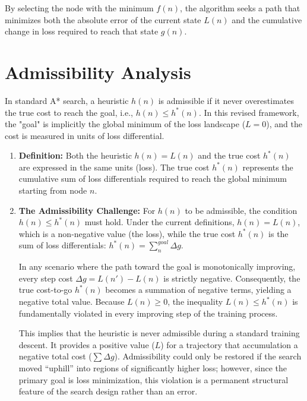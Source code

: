 By selecting the node with the minimum $f(n)$, the algorithm seeks a path that minimizes both the absolute error of the current state $L(n)$ and the cumulative change in loss required to reach that state $g(n)$.
\section{Admissibility Analysis}

In standard A* search, a heuristic $h(n)$ is admissible if it never overestimates the true cost to reach the goal, i.e., $h(n) \le h^*(n)$. In this revised framework, the "goal" is implicitly the global minimum of the loss landscape ($L=0$), and the cost is measured in units of loss differential.

\begin{enumerate}
    \item \textbf{Definition:} Both the heuristic $h(n) = L(n)$ and the true cost $h^*(n)$ are expressed in the same units (loss). The true cost $h^*(n)$ represents the cumulative sum of loss differentials required to reach the global minimum starting from node $n$.
    \item \textbf{The Admissibility Challenge:} For $h(n)$ to be admissible, the condition $h(n) \le h^*(n)$ must hold. Under the current definitions, $h(n) = L(n)$, which is a non-negative value (the loss), while the true cost $h^*(n)$ is the sum of loss differentials: $h^*(n) = \sum_{n}^{goal} \Delta g$.

In any scenario where the path toward the goal is monotonically improving, every step cost $\Delta g = L(n') - L(n)$ is strictly negative. Consequently, the true cost-to-go $h^*(n)$ becomes a summation of negative terms, yielding a negative total value. Because $L(n) \ge 0$, the inequality $L(n) \le h^*(n)$ is fundamentally violated in every improving step of the training process. 

This implies that the heuristic is never admissible during a standard training descent. It provides a positive value ($L$) for a trajectory that accumulation a negative total cost ($\sum \Delta g$). Admissibility could only be restored if the search moved ``uphill'' into regions of significantly higher loss; however, since the primary goal is loss minimization, this violation is a permanent structural feature of the search design rather than an error.
\end{enumerate}

